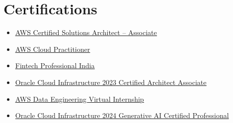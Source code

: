 \documentclass[a4paper,11pt]{article}
\newcommand{\resumeItem}[1]{
  \item\small{#1}
}
\newcommand{\resumeItemListStart}{\begin{itemize}[rightmargin=0.11in]}
\newcommand{\resumeItemListEnd}{\end{itemize}}
\begin{document}
\section{Certifications}
\resumeItemListStart
  \resumeItem{\href{https://www.linkedin.com/posts/siva-sekhar-kondudru_aws-certified-solutions-architect-associate-activity-7301969106331652096-APdg?utm_source=share&utm_medium=member_desktop&rcm=ACoAAEXHoGkBRv19sSSrvygDLucTRumeBdVS7N0}{\uline{AWS Certified Solutions Architect – Associate}}}
  \resumeItem{\href{https://www.linkedin.com/posts/siva-sekhar-kondudru_aws-academy-graduate-aws-academy-cloud-activity-7160619518732423168-bZpo?utm_source=share&utm_medium=member_desktop}{\uline{AWS Cloud Practitioner}}}
  \resumeItem{\href{https://drive.google.com/file/d/1M46Jr0lnhjoyjLmgjWNSoRC_2T-whgTN/view?usp=sharing}{\uline{Fintech Professional India}}}
  \resumeItem{\href{https://www.linkedin.com/posts/siva-sekhar-kondudru_oracle-certification-activity-7229883725252022274-ihwM?utm_source=share&utm_medium=member_desktop&rcm=ACoAAEXHoGkBRv19sSSrvygDLucTRumeBdVS7N0}{\uline{Oracle Cloud Infrastructure 2023 Certified Architect Associate}}}
  \resumeItem{\href{https://www.linkedin.com/posts/siva-sekhar-kondudru_aicte-certificate-activity-7205616902826557440-sxfe?utm_source=share&utm_medium=member_desktop}{\uline{AWS Data Engineering Virtual Internship}}}
  \resumeItem{\uline{Oracle Cloud Infrastructure 2024 Generative AI Certified Professional}}
\resumeItemListEnd{}

\end{document}
